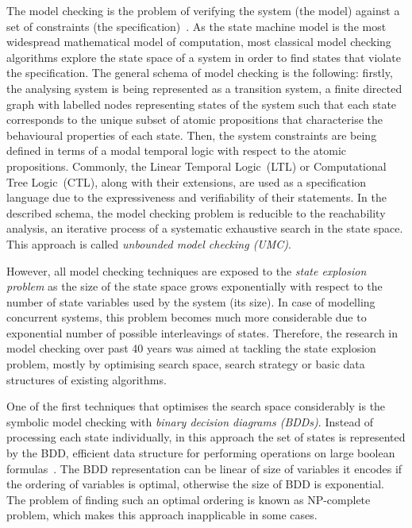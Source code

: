 The model checking is the problem of verifying the system (the model) against a set of constraints (the specification)~\cite{dkw2008}.
As the state machine model is the most widespread mathematical model of computation, most classical model checking algorithms explore the state space of a system in order to find states that violate the specification.
The general schema of model checking is the following: firstly, the analysing system is being represented as a transition system, a finite directed graph with labelled nodes representing states of the system such that each state corresponds to the unique subset of atomic propositions that characterise the behavioural properties of each state.
Then, the system constraints are being defined in terms of a modal temporal logic with respect to the atomic propositions. Commonly, the Linear Temporal Logic~(LTL) or Computational Tree Logic~(CTL), along with their extensions, are used as a specification language due to the expressiveness and verifiability of their statements. 
In the described schema, the model checking problem is reducible to the reachability analysis, an iterative process of a systematic exhaustive search in the state space. This approach is called \textit{unbounded model checking (UMC)}.

However, all model checking techniques are exposed to the \textit{state explosion problem} as the size of the state space grows exponentially with respect to the number of state variables used by the system (its size). In case of modelling concurrent systems, this problem becomes much more considerable due to exponential number of possible interleavings of states.
Therefore, the research in model checking over past 40 years was aimed at tackling the state explosion problem, mostly by optimising search space, search strategy or basic data structures of existing algorithms.

One of the first techniques that optimises the search space considerably is the symbolic model checking with \textit{binary decision diagrams (BDDs)}. Instead of processing each state individually, in this approach the set of states is represented by the BDD, efficient data structure for performing operations on large boolean formulas~\cite{clarke2012model}.
The BDD representation can be linear of size of variables it encodes if the ordering of variables is optimal, otherwise the size of BDD is exponential. The problem of finding such an optimal ordering is known as NP-complete problem, which makes this approach inapplicable in some cases.

